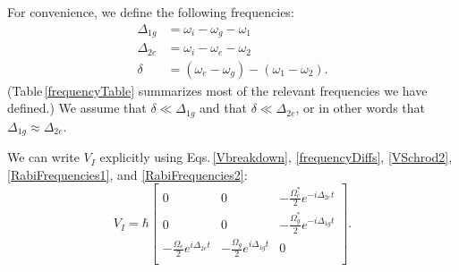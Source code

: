 For convenience, we define the following frequencies: 
\begin{align}
\label{frequencyDiffs}
\Delta_{1g}&=\omega_i-\omega_g-\omega_1\\
\Delta_{2e}&=\omega_i-\omega_e-\omega_2\\
\delta&=(\omega_e-\omega_g)-(\omega_1-\omega_2).
\end{align}
(Table\,\ref{frequencyTable} summarizes most of the relevant frequencies we have defined.) We assume that $\delta\ll\Delta_{1g}$ and that $\delta\ll\Delta_{2e}$, or in other words that $\Delta_{1g}\approx\Delta_{2e}$.

We can write $V_I$ explicitly using Eqs.\,\eqref{Vbreakdown}, \eqref{frequencyDiffs}, \eqref{VSchrod2}, \eqref{RabiFrequencies1}, and \eqref{RabiFrequencies2}:
\begin{equation}
\label{VI_matrix_simplified}
V_I=
\hbar
\begin{bmatrix}
0 & 0 & -\frac{\Omega_e^*}{2}e^{-i\Delta_{2e}t} \\
0 & 0 & -\frac{\Omega_g^*}{2}e^{-i\Delta_{1g}t}\\
-\frac{\Omega_e}{2}e^{i\Delta_{2e}t} & -\frac{\Omega_{g}}{2}e^{i\Delta_{1g}t} & 0 \\
\end{bmatrix}.
\end{equation}

